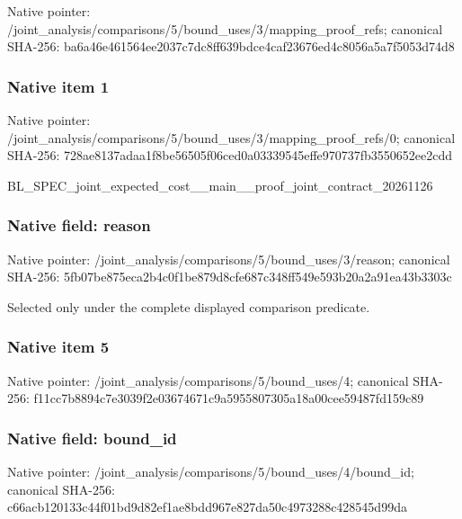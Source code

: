 \documentclass[10pt,a4paper]{article}
\begin{document}
Native pointer: /joint\_analysis/comparis\allowbreak{}ons/5/bound\_uses/3/mappi\allowbreak{}ng\_proof\_refs; canonical SHA-256: ba6a46e461564ee2037c7dc8\allowbreak{}ff639bdce4caf23676ed4c80\allowbreak{}56a5a7f5053d74d8



\subsubsection{Native item 1}


Native pointer: /joint\_analysis/comparis\allowbreak{}ons/5/bound\_uses/3/mappi\allowbreak{}ng\_proof\_refs/0; canonical SHA-256: 728ae8137adaa1f8be56505f\allowbreak{}06ced0a03339545effe97073\allowbreak{}7fb3550652ee2cdd


BL\_SPEC\_joint\_expected\_c\allowbreak{}ost\_\_main\_\_proof\_joint\_c\allowbreak{}ontract\_20261126


\subsubsection{Native field: reason}


Native pointer: /joint\_analysis/comparis\allowbreak{}ons/5/bound\_uses/3/reaso\allowbreak{}n; canonical SHA-256: 5fb07be875eca2b4c0f1be87\allowbreak{}9d8cfe687c348ff549e593b2\allowbreak{}0a2a91ea43b3303c


Selected only under the complete displayed comparison predicate.


\subsubsection{Native item 5}


Native pointer: /joint\_analysis/comparis\allowbreak{}ons/5/bound\_uses/4; canonical SHA-256: f11cc7b8894c7e3039f2e036\allowbreak{}74671c9a5955807305a18a00\allowbreak{}cee59487fd159c89



\subsubsection{Native field: bound\_id}


Native pointer: /joint\_analysis/comparis\allowbreak{}ons/5/bound\_uses/4/bound\allowbreak{}\_id; canonical SHA-256: c66acb120133c44f01bd9d82\allowbreak{}ef1ae8bdd967e827da50c497\allowbreak{}3288c428545d99da
\end{document}
